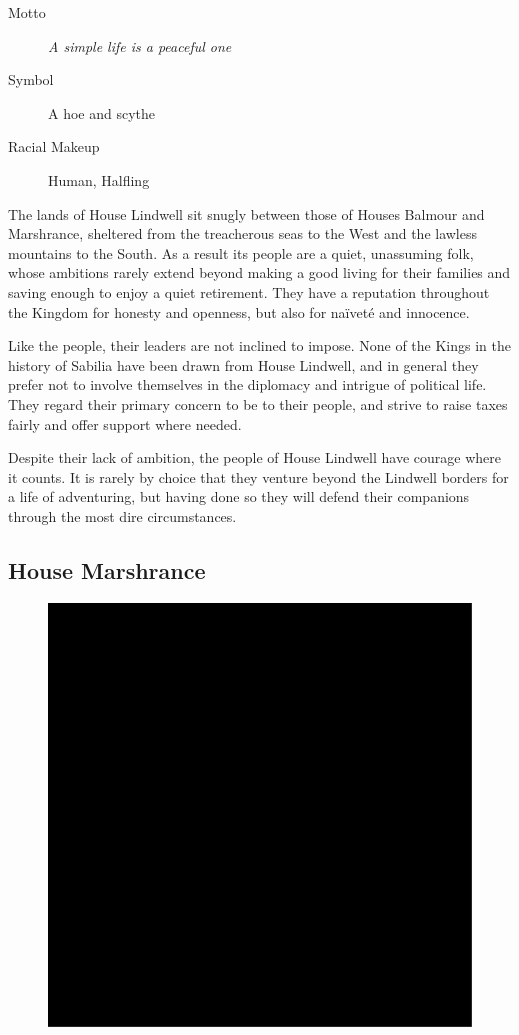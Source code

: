 \documentclass[10pt,twoside,openright,a4paper,twocolumn]{book}
\begin{document}
\begin{description}
\item[Motto] \textit{A simple life is a peaceful one}

\item[Symbol] A hoe and scythe

\item[Racial Makeup] Human, Halfling
\end{description}

The lands of House Lindwell sit snugly between those of Houses Balmour
and Marshrance, sheltered from the treacherous seas to the West and the
lawless mountains to the South.  As a result its people are a quiet, unassuming
folk, whose ambitions rarely extend beyond making a good living for their
families and saving enough to enjoy a quiet retirement.  They have a
reputation throughout the Kingdom for honesty and openness, but also for
na{\"i}vet{\'e} and innocence.

Like the people, their leaders are not inclined to impose.  None of the Kings
in the history of Sabilia have been drawn from House Lindwell, and in
general they prefer not to involve themselves in the diplomacy and intrigue
of political life.  They regard their primary concern to be to their people, and
strive to raise taxes fairly and offer support where needed.

Despite their lack of ambition, the people of House Lindwell have courage
where it counts. It is rarely by choice that they venture beyond the Lindwell
borders for a life of adventuring, but having done so they will defend their
companions through the most dire circumstances.

\subsection*{House Marshrance}

\begin{figure}
  \includegraphics[width=0.48\columnwidth]{images/HouseMarshrance}
\end{figure}
\end{document}
